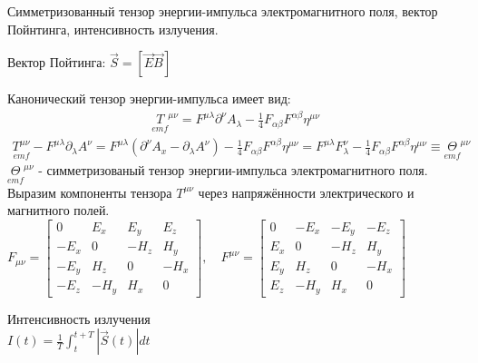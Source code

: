 \documentclass[__main__.tex]{subfiles}
\begin{document}
Симметризованный тензор энергии-импульса электромагнитного поля, вектор Пойнтинга, интенсивность излучения.\\ 

\begin{definition}
	Вектор Пойтинга: $\vec{S} = [\vec{E} \vec{B}]$ 
\end{definition}

Канонический тензор энергии-импульса имеет вид:
\begin{gather*}
\underset{emf}{T}^{\mu\nu} = F^{\mu\lambda}\partial^\nu A_\lambda - \frac{1}{4}F_{\alpha\beta}F^{\alpha\beta}\eta^{\mu\nu}
\end{gather*}
\begin{gather*}
\underset{emf}{T^{\mu\nu}} - F^{\mu\lambda}\partial_\lambda A^\nu = F^{\mu\lambda}(\partial^\nu A_x - \partial_\lambda A^\nu) - \frac{1}{4}F_{\alpha\beta}F^{\alpha\beta}\eta^{\mu\nu} = F^{\mu\lambda}F^\nu_\lambda - \frac{1}{4}F_{\alpha\beta}F^{\alpha\beta}\eta^{\mu\nu}\equiv \underset{emf}{\Theta}^{\mu\nu}
\end{gather*}
$\underset{emf}{\Theta}^{\mu\nu}$ - симметризованый тензор энергии-импульса электромагнитного поля.\\
Выразим компоненты тензора $T^{\mu\nu}$ через напряжённости электрического и магнитного полей.  
$F_{\mu\nu}= 
\begin{bmatrix}
0 & E_x & E_y & E_z\\
-E_x & 0 & -H_z & H_y\\
-E_y & H_z & 0 & -H_x\\
-E_z & -H_y & H_x & 0
\end{bmatrix},
\quad F^{\mu\nu} = 
\begin{bmatrix}
0 & -E_x & -E_y & -E_z\\
E_x & 0 & -H_z & H_y\\
E_y & H_z & 0 & -H_x\\
E_z & -H_y & H_x & 0
\end{bmatrix}
$

\begin{definition}
	Интенсивность излучения\\
	$I(t)=\frac{1}{T}\int^{t+T}_{t} |\vec{S}(t)| dt$
	\end{definition}
\end{document}

